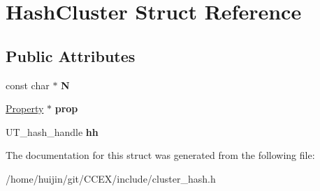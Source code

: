 \hypertarget{structHashCluster}{\section{Hash\-Cluster Struct Reference}
\label{structHashCluster}
}
\subsection*{Public Attributes}
\begin{DoxyCompactItemize}
\item 
\hypertarget{structHashCluster_a1032b8506ec3d4a0ad89dd042ddea0f1}{const char $\ast$ {\bfseries N}}\label{structHashCluster_a1032b8506ec3d4a0ad89dd042ddea0f1}

\item 
\hypertarget{structHashCluster_abca1f0b6edc93a160c79a4c3ceae1ad1}{\hyperlink{structProperty}{Property} $\ast$ {\bfseries prop}}\label{structHashCluster_abca1f0b6edc93a160c79a4c3ceae1ad1}

\item 
\hypertarget{structHashCluster_aca926dea37c8b07c62d0a99b0e1f2251}{U\-T\-\_\-hash\-\_\-handle {\bfseries hh}}\label{structHashCluster_aca926dea37c8b07c62d0a99b0e1f2251}

\end{DoxyCompactItemize}


The documentation for this struct was generated from the following file\-:\begin{DoxyCompactItemize}
\item 
/home/huijin/git/\-C\-C\-E\-X/include/cluster\-\_\-hash.\-h\end{DoxyCompactItemize}
